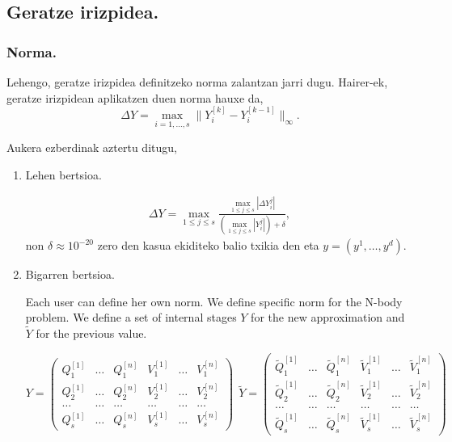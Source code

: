 \subsection*{Geratze irizpidea.}


\subsubsection*{Norma.}
Lehengo, geratze irizpidea definitzeko norma zalantzan jarri dugu. Hairer-ek, geratze irizpidean aplikatzen duen norma hauxe da,
\begin{equation*}
\Delta Y= \max_{i=1,\dots,s} \|Y_i^{[k]}-Y_i^{[k-1]}\|_{\infty}.
\end{equation*}

Aukera ezberdinak aztertu ditugu,
\begin{enumerate}
\item Lehen bertsioa.

\begin{align*}
\Delta Y= \max_{1 \leqslant j \leqslant s} \frac{\max_{1 \leqslant j \leqslant s} |\Delta Y_i^j|}
                                                {(\max_{1 \leqslant j \leqslant s}|Y_i^j|)+\delta},
\end{align*}
non $\delta \approx 10^{-20}$ zero den kasua ekiditeko balio txikia den eta $y=(y^1,\dots,y^d)$.

\item Bigarren bertsioa.

Each user can define her own norm. We define specific norm for the N-body problem.
We define a set of internal stages $Y$ for the new approximation and $\tilde Y$ for the previous value.

\[Y=\left( \begin{array}{cccccc}
Q^{[1]}_1 & \dots  & Q^{[n]}_1 & V^{[1]}_1 & \dots  & V^{[n]}_1 \\ 
Q^{[1]}_2 & \dots  & Q^{[n]}_2 & V^{[1]}_2 & \dots  & V^{[n]}_2 \\ 
\dots  & \dots  & \dots  & \dots  & \dots  & \dots  \\ 
Q^{[1]}_s & \dots  & Q^{[n]}_s & V^{[1]}_s & \dots  & V^{[n]}_s \end{array}
\right)\ \  
\tilde Y=\left( \begin{array}{cccccc}
\tilde Q^{[1]}_1 & \dots  & \tilde Q^{[n]}_1 & \tilde V^{[1]}_1 & \dots  & \tilde V^{[n]}_1 \\ 
\tilde Q^{[1]}_2 & \dots  & \tilde Q^{[n]}_2 & \tilde V^{[1]}_2 & \dots  & \tilde V^{[n]}_2 \\ 
\dots  & \dots  & \dots  & \dots  & \dots  & \dots  \\ 
\tilde Q^{[1]}_s & \dots  & \tilde Q^{[n]}_s & \tilde V^{[1]}_s & \dots  & \tilde V^{[n]}_s \end{array}
\right)\] 


\end{enumerate}
